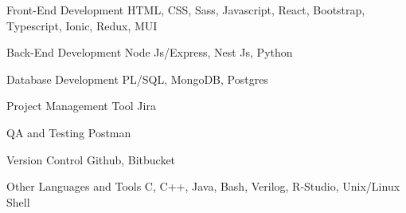 \newcommand{\Csh}{C{\lserif\#}}



\begin{cvskills}




\cvskill
{Front-End Development} %
{HTML, CSS, Sass, Javascript, React, Bootstrap, Typescript, Ionic, Redux, MUI} %


\cvskill
{Back-End Development} %
{Node Js/Express, Nest Js, Python} %


\cvskill
{Database Development} %
{PL/SQL, MongoDB, Postgres} %





\cvskill
{Project Management Tool} %
{Jira} %


\cvskill
{QA and Testing} %
{Postman} %


\cvskill
{Version Control} %
{Github, Bitbucket} %


\cvskill
{Other Languages and Tools} %
{C, C++, Java, Bash, Verilog, R-Studio, Unix/Linux Shell} %


\end{cvskills}